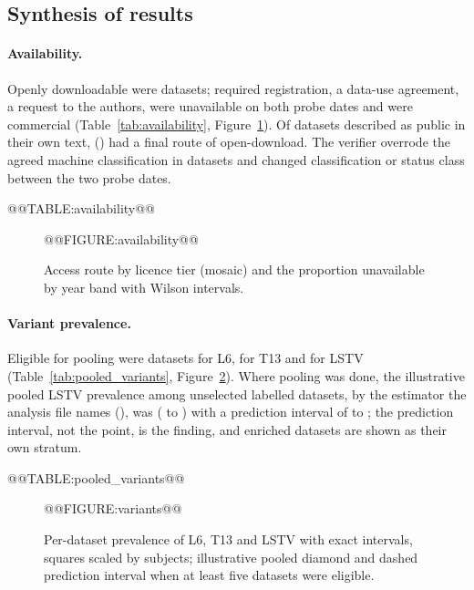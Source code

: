 \documentclass[11pt,a4paper]{article}
\newcommand{\tabref}[1]{Table~\ref{tab:#1}}
\newcommand{\figref}[1]{Figure~\ref{fig:#1}}
\begin{document}
\subsection{Synthesis of results}\label{sec:synthesis_results}
\paragraph{Availability.} Openly downloadable were \numwordOpenDownload{} datasets; \numwordRegistration{} required registration, \numwordDUA{} a data-use agreement, \numwordRequestToAuthors{} a request to the authors, \numwordUnavailable{} were unavailable on both probe dates and \numwordCommercial{} were commercial (\tabref{availability}, \figref{availability}). Of \numwordDescribedPublic{} datasets described as public in their own text, \numwordDescribedPublicDownloads{} (\numPctDescribedPublicDownloads) had a final route of open-download. The verifier overrode the agreed machine classification in \numwordVerifierOverrides{} datasets and \numwordProbeChanged{} changed classification or status class between the two probe dates.

@@TABLE:availability@@

\begin{figure}[H]
\centering
@@FIGURE:availability@@
\caption{Access route by licence tier (mosaic) and the proportion unavailable by year band with Wilson intervals.}\label{fig:availability}
\end{figure}

\paragraph{Variant prevalence.} Eligible for pooling were \numwordPoolableLSix{} datasets for L6, \numwordPoolableTThirteen{} for T13 and \numwordPoolableLSTV{} for LSTV (\tabref{pooled_variants}, \figref{variants}). Where pooling was done, the illustrative pooled LSTV prevalence among unselected labelled datasets, by the estimator the analysis file names (\numPooledEstimator), was \numPooledLSTV{} (\numPooledLSTVLow{} to \numPooledLSTVHigh) with a prediction interval of \numPiLSTVLow{} to \numPiLSTVHigh; the prediction interval, not the point, is the finding, and enriched datasets are shown as their own stratum.

@@TABLE:pooled_variants@@

\begin{figure}[H]
\centering
@@FIGURE:variants@@
\caption{Per-dataset prevalence of L6, T13 and LSTV with exact intervals, squares scaled by subjects; illustrative pooled diamond and dashed prediction interval when at least five datasets were eligible.}\label{fig:variants}
\end{figure}
\end{document}
